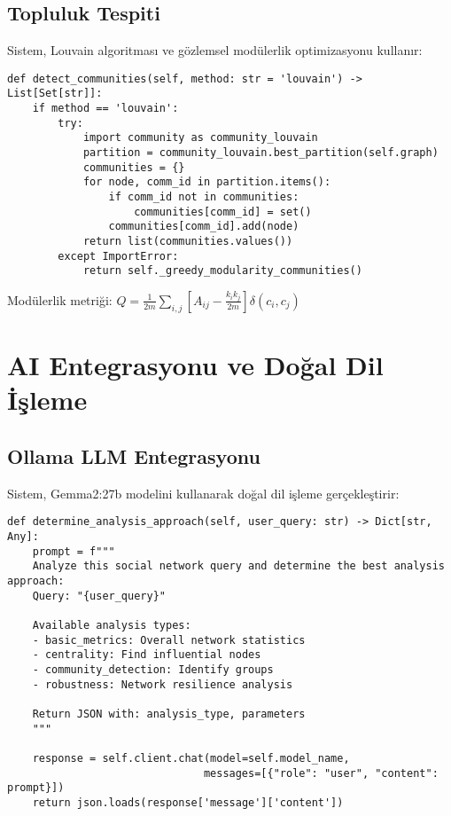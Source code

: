 \documentclass[conference]{IEEEtran}
\begin{document}
\subsection{Topluluk Tespiti}

Sistem, Louvain algoritması ve gözlemsel modülerlik optimizasyonu kullanır:

\begin{lstlisting}[caption=Topluluk Tespiti Algoritması]
def detect_communities(self, method: str = 'louvain') -> List[Set[str]]:
    if method == 'louvain':
        try:
            import community as community_louvain
            partition = community_louvain.best_partition(self.graph)
            communities = {}
            for node, comm_id in partition.items():
                if comm_id not in communities:
                    communities[comm_id] = set()
                communities[comm_id].add(node)
            return list(communities.values())
        except ImportError:
            return self._greedy_modularity_communities()
\end{lstlisting}

Modülerlik metriği: $Q = \frac{1}{2m} \sum_{i,j} \left[ A_{ij} - \frac{k_i k_j}{2m} \right] \delta(c_i, c_j)$

\section{AI Entegrasyonu ve Doğal Dil İşleme}

\subsection{Ollama LLM Entegrasyonu}

Sistem, Gemma2:27b modelini kullanarak doğal dil işleme gerçekleştirir:

\begin{lstlisting}[caption=LLM ile Analiz Türü Belirleme]
def determine_analysis_approach(self, user_query: str) -> Dict[str, Any]:
    prompt = f"""
    Analyze this social network query and determine the best analysis approach:
    Query: "{user_query}"
    
    Available analysis types:
    - basic_metrics: Overall network statistics
    - centrality: Find influential nodes
    - community_detection: Identify groups
    - robustness: Network resilience analysis
    
    Return JSON with: analysis_type, parameters
    """
    
    response = self.client.chat(model=self.model_name, 
                               messages=[{"role": "user", "content": prompt}])
    return json.loads(response['message']['content'])
\end{lstlisting}
\end{document}
